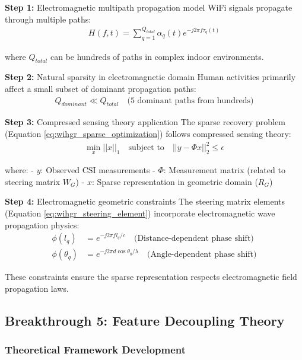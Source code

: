 \documentclass[12pt,a4paper]{article}
\begin{document}
\textbf{Step 1:} Electromagnetic multipath propagation model
WiFi signals propagate through multiple paths:
\begin{align}
H(f,t) = \sum_{q=1}^{Q_{total}} \alpha_q(t) e^{-j2\pi f \tau_q(t)} \label{eq:multipath_general}
\end{align}

where $Q_{total}$ can be hundreds of paths in complex indoor environments.

\textbf{Step 2:} Natural sparsity in electromagnetic domain
Human activities primarily affect a small subset of dominant propagation paths:
\begin{align}
Q_{dominant} \ll Q_{total} \quad \text{(5 dominant paths from hundreds)} \label{eq:natural_sparsity}
\end{align}

\textbf{Step 3:} Compressed sensing theory application
The sparse recovery problem (Equation \ref{eq:wihgr_sparse_optimization}) follows compressed sensing theory:
\begin{align}
\min_{x} ||x||_1 \quad \text{subject to} \quad ||y - \Phi x||_2^2 \leq \epsilon \label{eq:compressed_sensing_standard}
\end{align}

where:
- $y$: Observed CSI measurements
- $\Phi$: Measurement matrix (related to steering matrix $W_G$)
- $x$: Sparse representation in geometric domain ($R_G$)

\textbf{Step 4:} Electromagnetic geometric constraints
The steering matrix elements (Equation \ref{eq:wihgr_steering_element}) incorporate electromagnetic wave propagation physics:
\begin{align}
\phi(l_q) &= e^{-j2\pi f l_q/c} \quad \text{(Distance-dependent phase shift)} \label{eq:distance_phase}\\
\phi(\theta_q) &= e^{-j2\pi d \cos\theta_q/\lambda} \quad \text{(Angle-dependent phase shift)} \label{eq:angle_phase}
\end{align}

These constraints ensure the sparse representation respects electromagnetic field propagation laws.

\subsection{Breakthrough 5: Feature Decoupling Theory}

\subsubsection{Theoretical Framework Development}
\end{document}
